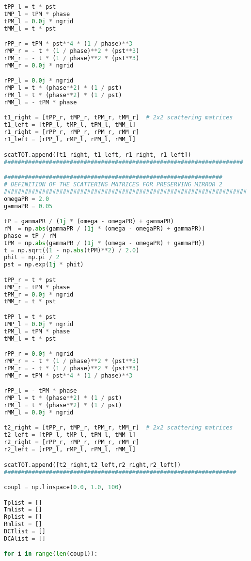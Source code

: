 \documentclass[aps,prl,10pt,onecolumn,superscriptaddress]{revtex4-2}
\begin{document}
\begin{lstlisting}[language=Python, caption=Script for Figure 15]
tPP_l = t * pst 
tMP_l = tPM * phase 
tPM_l = 0.0j * ngrid
tMM_l = t * pst 

rPP_r = tPM * pst**4 * (1 / phase)**3 
rMP_r = - t * (1 / phase)**2 * (pst**3) 
rPM_r = - t * (1 / phase)**2 * (pst**3) 
rMM_r = 0.0j * ngrid

rPP_l = 0.0j * ngrid
rMP_l = t * (phase**2) * (1 / pst)
rPM_l = t * (phase**2) * (1 / pst)
rMM_l = - tPM * phase

t1_right = [tPP_r, tMP_r, tPM_r, tMM_r]  # 2x2 scattering matrices
t1_left = [tPP_l, tMP_l, tPM_l, tMM_l]
r1_right = [rPP_r, rMP_r, rPM_r, rMM_r]
r1_left = [rPP_l, rMP_l, rPM_l, rMM_l]

scatTOT.append([t1_right, t1_left, r1_right, r1_left])
#####################################################################

###############################################################
# DEFINITION OF THE SCATTERING MATRICES FOR PRESERVING MIRROR 2
######################################################################
omegaPR = 2.0
gammaPR = 0.05

tP = gammaPR / (1j * (omega - omegaPR) + gammaPR)
rM  = np.abs(gammaPR / (1j * (omega - omegaPR) + gammaPR))
phase = tP / rM
tPM = np.abs(gammaPR / (1j * (omega - omegaPR) + gammaPR))
t = np.sqrt((1 - np.abs(tPM)**2) / 2.0)
phit = np.pi / 2
pst = np.exp(1j * phit)

tPP_r = t * pst
tMP_r = tPM * phase
tPM_r = 0.0j * ngrid
tMM_r = t * pst

tPP_l = t * pst
tMP_l = 0.0j * ngrid
tPM_l = tPM * phase
tMM_l = t * pst

rPP_r = 0.0j * ngrid
rMP_r = - t * (1 / phase)**2 * (pst**3) 
rPM_r = - t * (1 / phase)**2 * (pst**3) 
rMM_r = tPM * pst**4 * (1 / phase)**3

rPP_l = - tPM * phase
rMP_l = t * (phase**2) * (1 / pst)
rPM_l = t * (phase**2) * (1 / pst)
rMM_l = 0.0j * ngrid

t2_right = [tPP_r, tMP_r, tPM_r, tMM_r]  # 2x2 scattering matrices
t2_left = [tPP_l, tMP_l, tPM_l, tMM_l]
r2_right = [rPP_r, rMP_r, rPM_r, rMM_r]
r2_left = [rPP_l, rMP_l, rPM_l, rMM_l]

scatTOT.append([t2_right,t2_left,r2_right,r2_left])
###################################################################

coupl = np.linspace(0.0, 1.0, 100)

Tplist = []
Tmlist = []
Rplist = []
Rmlist = []
DCTlist = []
DCAlist = []

for i in range(len(coupl)):
    

\end{lstlisting}
\end{document}

